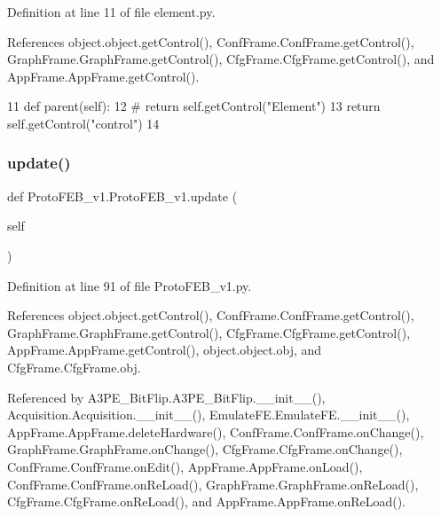 Definition at line 11 of file element.\+py.



References object.\+object.\+get\+Control(), Conf\+Frame.\+Conf\+Frame.\+get\+Control(), Graph\+Frame.\+Graph\+Frame.\+get\+Control(), Cfg\+Frame.\+Cfg\+Frame.\+get\+Control(), and App\+Frame.\+App\+Frame.\+get\+Control().


\begin{DoxyCode}
11     \textcolor{keyword}{def }parent(self):
12 \textcolor{comment}{#        return self.getControl("Element")}
13         \textcolor{keywordflow}{return} self.getControl(\textcolor{stringliteral}{"control"})
14    
\end{DoxyCode}
\mbox{\label{classProtoFEB__v1_1_1ProtoFEB__v1_a659da21751fdb6a04fbdce9862ca0043}} 
\subsubsection{\texorpdfstring{update()}{update()}}
{\footnotesize\ttfamily def Proto\+F\+E\+B\+\_\+v1.\+Proto\+F\+E\+B\+\_\+v1.\+update (\begin{DoxyParamCaption}\item[{}]{self }\end{DoxyParamCaption})}



Definition at line 91 of file Proto\+F\+E\+B\+\_\+v1.\+py.



References object.\+object.\+get\+Control(), Conf\+Frame.\+Conf\+Frame.\+get\+Control(), Graph\+Frame.\+Graph\+Frame.\+get\+Control(), Cfg\+Frame.\+Cfg\+Frame.\+get\+Control(), App\+Frame.\+App\+Frame.\+get\+Control(), object.\+object.\+obj, and Cfg\+Frame.\+Cfg\+Frame.\+obj.



Referenced by A3\+P\+E\+\_\+\+Bit\+Flip.\+A3\+P\+E\+\_\+\+Bit\+Flip.\+\_\+\+\_\+init\+\_\+\+\_\+(), Acquisition.\+Acquisition.\+\_\+\+\_\+init\+\_\+\+\_\+(), Emulate\+F\+E.\+Emulate\+F\+E.\+\_\+\+\_\+init\+\_\+\+\_\+(), App\+Frame.\+App\+Frame.\+delete\+Hardware(), Conf\+Frame.\+Conf\+Frame.\+on\+Change(), Graph\+Frame.\+Graph\+Frame.\+on\+Change(), Cfg\+Frame.\+Cfg\+Frame.\+on\+Change(), Conf\+Frame.\+Conf\+Frame.\+on\+Edit(), App\+Frame.\+App\+Frame.\+on\+Load(), Conf\+Frame.\+Conf\+Frame.\+on\+Re\+Load(), Graph\+Frame.\+Graph\+Frame.\+on\+Re\+Load(), Cfg\+Frame.\+Cfg\+Frame.\+on\+Re\+Load(), and App\+Frame.\+App\+Frame.\+on\+Re\+Load().


